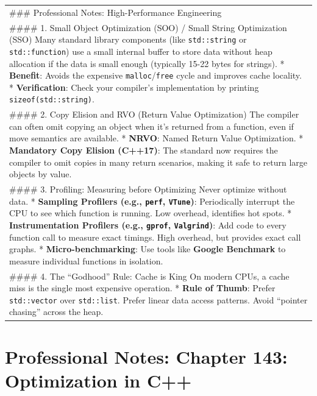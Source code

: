 \begin{longtable}[]{@{}
  >{\raggedright\arraybackslash}p{}@{}}
\toprule
\endhead
\#\#\# Professional Notes: High-Performance Engineering \\
\#\#\#\# 1. Small Object Optimization (SOO) / Small String Optimization
(SSO) Many standard library components (like
\passthrough{\lstinline!std::string!} or
\passthrough{\lstinline!std::function!}) use a small internal buffer to
store data without heap allocation if the data is small enough
(typically 15-22 bytes for strings). * \textbf{Benefit}: Avoids the
expensive
\passthrough{\lstinline!malloc!}/\passthrough{\lstinline!free!} cycle
and improves cache locality. * \textbf{Verification}: Check your
compiler's implementation by printing
\passthrough{\lstinline!sizeof(std::string)!}. \\
\#\#\#\# 2. Copy Elision and RVO (Return Value Optimization) The
compiler can often omit copying an object when it's returned from a
function, even if move semantics are available. * \textbf{NRVO}: Named
Return Value Optimization. * \textbf{Mandatory Copy Elision (C++17)}:
The standard now requires the compiler to omit copies in many return
scenarios, making it safe to return large objects by value. \\
\#\#\#\# 3. Profiling: Measuring before Optimizing Never optimize
without data. * \textbf{Sampling Profilers (e.g.,
\passthrough{\lstinline!perf!}, \passthrough{\lstinline!VTune!})}:
Periodically interrupt the CPU to see which function is running. Low
overhead, identifies hot spots. * \textbf{Instrumentation Profilers
(e.g., \passthrough{\lstinline!gprof!},
\passthrough{\lstinline!Valgrind!})}: Add code to every function call to
measure exact timings. High overhead, but provides exact call graphs. *
\textbf{Micro-benchmarking}: Use tools like \textbf{Google Benchmark} to
measure individual functions in isolation. \\
\#\#\#\# 4. The ``Godhood'' Rule: Cache is King On modern CPUs, a cache
miss is the single most expensive operation. * \textbf{Rule of Thumb}:
Prefer \passthrough{\lstinline!std::vector!} over
\passthrough{\lstinline!std::list!}. Prefer linear data access patterns.
Avoid ``pointer chasing'' across the heap. \\
\bottomrule
\end{longtable}

\hypertarget{professional-notes-chapter-143-optimization-in-c}{%
\chapter{Professional Notes: Chapter 143: Optimization in
C++}\label{professional-notes-chapter-143-optimization-in-c}}

